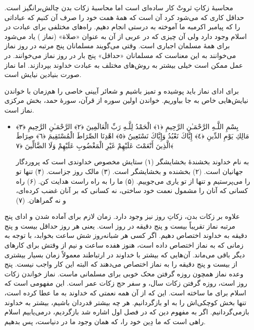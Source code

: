 محاسبهٔ زکاتِ ثروتْ کار ساده‌ای است اما محاسبهٔ زکات بدن چالش‌برانگیز است. حداقل کاری که می‌شود کرد آن است که همهٔ همت خود را صرف آن کنیم که عباداتی را که پیامبر اکرم{}به ما آموخته به درستی انجام دهیم. راه‌های مختلفی برای عبادت در اسلام وجود دارد ولی آن چیزی که در عربی از آن به عنوان «صلاة» (نماز ) یاد می‌شود برای همهٔ مسلمان اجباری است. وقتی می‌گویند مسلمانان پنج مرتبه در روز نماز می‌خوانند به این معناست که مسلمانان «حداقل» پنج بار در روز نماز می‌خوانند. در عمل ممکن است خیلی بیشتر به روش‌های مختلف به عبادت خداوند بپردازند. اما نماز صورت بنیادین نیایش است.

برای ادای نماز باید پوشیده و تمیز باشیم و شعائر آیینی خاصی را هم‌زمان با خواندن نیایش‌هایی خاص به جا بیاوریم. خواندن اولین سوره از قرآن، سورهٔ حمد، بخش مرکزی نماز است. 

\begin{itemize}
	\item[]
	{
		بِسْمِ اللَّـهِ الرَّحْمَـٰنِ الرَّحِيمِ ﴿١﴾ الْحَمْدُ لِلَّـهِ رَبِّ الْعَالَمِينَ ﴿٢﴾ الرَّحْمَـٰنِ الرَّحِيمِ ﴿٣﴾ مَالِكِ يَوْمِ الدِّينِ ﴿٤﴾ إِيَّاكَ نَعْبُدُ وَإِيَّاكَ نَسْتَعِينُ ﴿٥﴾ اهْدِنَا الصِّرَاطَ الْمُسْتَقِيمَ ﴿٦﴾ صِرَاطَ الَّذِينَ أَنْعَمْتَ عَلَيْهِمْ غَيْرِ الْمَغْضُوبِ عَلَيْهِمْ وَلَا الضَّالِّينَ ﴿٧﴾}
	
	{
		به نام خداوند بخشندهٔ بخشایشگر (۱) ستایش مخصوص خداوندی است که پروردگار جهانیان است. (۲) بخشنده و بخشایشگر است. (۳)  مالک روز جزاست. (۴) تنها تو را می‌پرستیم و تنها از تو یاری می‌جوییم. (۵) ما را به راه راست هدایت کن. (۶) راه کسانی که آنان را مشمول نعمت خود ساختی، نه کسانی که بر آنان غضب کرده‌ای، و نه گمراهان. (۷)
	}
\end{itemize}

علاوه بر زکات بدن، زکاتِ روز نیز وجود دارد. زمان لازم برای آماده شدن و ادای پنج مرتبه نماز تقریباً بیست و پنج دقیقه در روز است. یعنی هر روز حداقل بیست و پنج دقیقه به خداوند اختصاص دهیم. اگر کسی هر شبانه‌روز شش ساعت بخوابد، با توجه به زمانی که به نماز اختصاص داده است، هنوز هفده ساعت و نیم از وقتش برای کارهای دیگر باقی می‌ماند. آن‌هایی که بیشتر با خداوند در ارتباطند معمولاً زمان بسیار بیشتری از بیست و پنج دقیقه را به نماز اختصاص می‌دهند که البته این کار واجب نیست. پنج وعده نماز همچون روزه گرفتن محک خوبی برای مسلمانی ماست. نماز خواندن زکات روز است، روزه گرفتن زکات سال، و سفر حج زکات عمر است. این مفهومی است که اسلام برای ما ساخته است. این که از آن همه نعمتی که خداوند به ما عطا کرده است، تنها بخش کوچکی‌اش را به او بازگردانیم. هر چه بیشتر قدردان باشیم، بیشتر به خداوند بازمی‌گردانیم. اگر به مفهوم دین که در فصل اول اشاره شد بازگردیم، درمی‌یابیم اسلام راهی است که ما دِین خود را، که همان وجود ما در دنیاست، پس بدهیم. 

